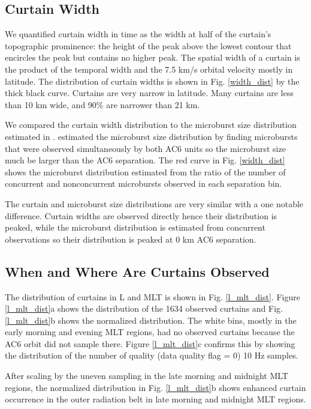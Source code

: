 \documentclass[draft]{agujournal2019}
\begin{document}
\subsection{Curtain Width}
We quantified curtain width in time as the width at half of the curtain's topographic prominence: the height of the peak above the lowest contour that encircles the peak but contains no higher peak. The spatial width of a curtain is the product of the temporal width and the 7.5 km/s orbital velocity mostly in latitude. The distribution of curtain widths is shown in Fig. \ref{width_dist} by the thick black curve. Curtains are very narrow in latitude. Many curtains are less than 10 km wide, and 90\% are narrower than 21 km.
	
We compared the curtain width distribution to the microburst size distribution estimated in .  estimated the microburst size distribution by finding microbursts that were observed simultaneously by both AC6 units so the microburst size much be larger than the AC6 separation. The red curve in Fig. \ref{width_dist} shows the microburst distribution estimated from the ratio of the number of concurrent and nonconcurrent microbursts observed in each separation bin. 

The curtain and microburst size distributions are very similar with a one notable difference. Curtain widths are observed directly hence their distribution is peaked, while the microburst distribution is estimated from concurrent observations so their distribution is peaked at 0 km AC6 separation.

\subsection{When and Where Are Curtains Observed}
The distribution of curtains in L and MLT is shown in Fig. \ref{l_mlt_dist}. Figure \ref{l_mlt_dist}a shows the distribution of the 1634 observed curtains and Fig. \ref{l_mlt_dist}b shows the normalized distribution. The white bins, mostly in the early morning and evening MLT regions, had no observed curtains because the AC6 orbit did not sample there. Figure \ref{l_mlt_dist}c confirms this by showing the distribution of the number of quality (data quality flag = 0) 10 Hz samples.

After scaling by the uneven sampling in the late morning and midnight MLT regions, the normalized distribution in Fig. \ref{l_mlt_dist}b shows enhanced curtain occurrence in the outer radiation belt in late morning and midnight MLT regions.
\end{document}
